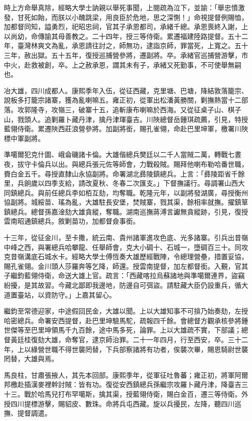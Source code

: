 \begin{pinyinscope}
時上方命舉真除，經略大學士訥親以舉死事聞，上閱疏為泣下，並諭：「舉忠憤激發，甘死如飴，而朕以小醜跳梁，用良臣於危地，思之深惻！」命視提督例賜恤，加都督同知，謚勇烈，祀昭忠祠，官其子承恩都司，承緒千總。承恩喪終入謝，上以尚幼，命傳諭其母善教之。二十四年，授三等侍衛。累遷福建陸路提督。五十二年，臺灣林爽文為亂，承恩請往討之，師無功，逮詣京師，罪當死，上寬之。五十三年，赦出獄。五十五年，復授巡捕營參將，遷副將。卒。承緒官巡捕營游擊，市中火，赴救被創，卒。上之赦承恩，謂其未有子，承緒又死勤事，不可使舉無嗣也。

冶大雄，四川成都人。康熙季年入伍，從征西藏，克里塘、巴塘，降結敦落籠宗、說板多打籠宗諸寨，獲為亂喇嘛五。雍正初，從軍出松潘黃勝關，剿撫熱當十二部落。攻郭隆寺，攻嶺三，破寨十五，追斬康布喇嘛於西海。又從征桌子山、棋子山，戮頭人。追剿羅卜藏丹津，擒丹津琿臺吉。川陜總督岳鍾琪疏薦，引見，特授藍翎侍衛。累遷陜西莊浪營參將。加副將銜，賜孔雀翎，命赴巴里坤軍，檄署川陜標中軍副將。

準噶爾犯克什圖、峨侖磯諸卡倫。大雄偕總兵樊廷以二千人當賊二萬，轉戰七晝夜，拔守卡倫兵以出。與總兵張元佐等師會，力戰殺賊。賜拜他喇布勒哈番世職，賚白金五千。尋授直隸山永協副將。命署湖北彞陵鎮總兵。上言：「彞陵距省千餘里，兵餉歲以四季支給，請改夏秋、冬春二次匯支。」下督撫議行。尋調署山西大同鎮總兵。與前任總兵李如栢互劾，均奪職。乾隆元年，以副將發湖廣，尋授衡州協副將。城綏苗、瑤為亂，大雄駐長安堡，焚賊寨，戮其渠，餘相率就撫。擢鎮筸鎮總兵。總督孫嘉淦劾大雄貪縱，奪職。湖南巡撫蔣溥言讞無貪縱跡，引見，復授雲南昭通鎮總兵。敘剿苗功，加都督僉事銜。

十三年，從征金川，至卡撒，統云南、貴州諸軍進攻色底、光多諸寨。引兵出昔嶺中峰之西，與署總兵哈攀龍、任舉師會，克大小碉十、石城一，墮碉百三十。同攻克昔嶺溝底石城水卡。經略大學士傅恆奏大雄歷經戰陣，令總理營壘，措置妥協，賜孔雀翎。金川頭人莎羅奔等乞降，師還。授雲南提督，加左都督銜。入覲，官其子繼鈞藍翎侍衛，命送大雄上官。疏言：「西藏喀拉烏蘇諸地與準噶爾連界，盜竊紛擾，是其故習。今藏北鄙即我邊地，防邊自可弭盜。請駐藏大臣仍設重兵，循大道置臺站，以資防守。」上嘉其留心。

繼鈞至常德迎家，中途假回民金，大雄以聞。上以大雄知事不可揜乃始奏劾，左授哈密總兵。命署安西提督，赴巴里坤驗馬駝，疏報四千餘。會總督方觀承核參將鍾世傑等至巴里坤領馬千九百餘，途中馬多死，論罪。上以大雄疏不實，下部議；總督黃廷桂復劾大雄，命奪官，逮京師治罪。二十一年四月，行至西安，卒。三十二年，上以綠營世職不得世襲罔替，下兵部察諸將有功者，俟襲次畢，賜恩騎尉世襲罔替，大雄與焉。

馬良柱，甘肅張掖人，其先本回部。康熙季年，從軍征吐魯蕃；雍正初，將軍阿爾邦檄赴插漢麥裡幹討賊：皆有功。復從安西鎮總兵孫繼宗攻羅卜藏丹津，降臺吉三十三。戰於哈馬兒打布罕噶斯，擒其渠，授藍翎侍衛，賜白金百，遷三等侍衛。外授四川提標游擊，賜貂皮、數珠。命將兵屯西藏。旋以兵擾民，左降，聽四川巡撫、提督調遣。


\end{pinyinscope}
